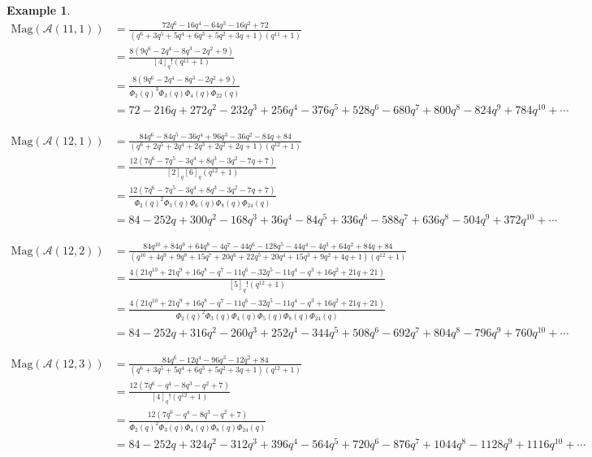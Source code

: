\documentclass{amsart}
\numberwithin{equation}{section}
\theoremstyle{plain}
\theoremstyle{remark}
\theoremstyle{definition}
\newtheorem{ex}[thm]{Example}
\numberwithin{equation}{section}
\newcommand{\A}{\mathcal{A}}
\newcommand{\Mag}{\mathrm{Mag}}
\begin{document}
\begin{ex}
        \begin{align*}
        \Mag(\A(11,1))&=\frac{72q^6-16q^4-64q^3-16q^2+72}{(q^6+3q^5+5q^4+6q^3+5q^2+3q+1)(q^{11}+1)}\\
        &=\frac{8(9q^6-2q^4-8q^3-2q^2+9)}{[4]_q!(q^{11}+1)}\\
        &=\frac{8(9q^6-2q^4-8q^3-2q^2+9)}{\Phi_2(q)^3\Phi_3(q)\Phi_4(q)\Phi_{22}(q)}\\
        &=72-216q+272q^2-232q^3+256q^4-376q^5+528q^6-680q^7+800q^8-824q^9+784q^{10}+\cdots
    \end{align*}

    \begin{align*}
        \Mag(\A(12,1))&=\frac{84q^6-84q^5-36q^4+96q^3-36q^2-84q+84}{(q^6+2q^5+2q^4+2q^3+2q^2+2q+1)(q^{12}+1)}\\
        &=\frac{12(7q^6-7q^5-3q^4+8q^3-3q^2-7q+7)}{[2]_q[6]_q(q^{12}+1)}\\
        &=\frac{12(7q^6-7q^5-3q^4+8q^3-3q^2-7q+7)}{\Phi_2(q)^2\Phi_3(q)\Phi_6(q)\Phi_8(q)\Phi_{24}(q)}\\
        &=84-252q+300q^2-168q^3+36q^4-84q^5+336q^6-588q^7+636q^8-504q^9+372q^{10}+\cdots
    \end{align*}

    \begin{align*}
        \Mag(\A(12,2))&=\frac{84q^{10}+84q^9+64q^8-4q^7-44q^6-128q^5-44q^4-4q^3+64q^2+84q+84}{(q^{10}+4q^9+9q^8+15q^7+20q^6+22q^5+20q^4+15q^3+9q^2+4q+1)(q^{12}+1)}\\
        &=\frac{4(21q^{10}+21q^9+16q^8-q^7-11q^6-32q^5-11q^4-q^3+16q^2+21q+21)}{[5]_q!(q^{12}+1)}\\
        &=\frac{4(21q^{10}+21q^9+16q^8-q^7-11q^6-32q^5-11q^4-q^3+16q^2+21q+21)}{\Phi_2(q)^2\Phi_3(q)\Phi_4(q)\Phi_5(q)\Phi_8(q)\Phi_{24}(q)}\\
        &=84-252q+316q^2-260q^3+252q^4-344q^5+508q^6-692q^7+804q^8-796q^9+760q^{10}+\cdots
    \end{align*}

    \begin{align*}
        \Mag(\A(12,3))&=\frac{84q^6-12q^4-96q^3-12q^2+84}{(q^6+3q^5+5q^4+6q^3+5q^2+3q+1)(q^{12}+1)}\\
        &=\frac{12(7q^6-q^4-8q^3-q^2+7)}{[4]_q!(q^{12}+1)}\\
        &=\frac{12(7q^6-q^4-8q^3-q^2+7)}{\Phi_2(q)^2\Phi_3(q)\Phi_4(q)\Phi_8(q)\Phi_{24}(q)}\\
        &=84-252q+324q^2-312q^3+396q^4-564q^5+720q^6-876q^7+1044q^8-1128q^9+1116q^{10}+\cdots
    \end{align*}


\end{ex}
\end{document}

